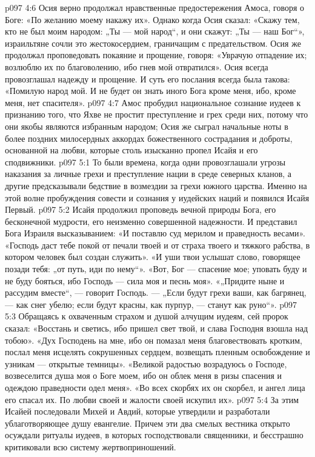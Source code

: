 \vs p097 4:6 Осия верно продолжал нравственные предостережения Амоса, говоря о Боге: «По желанию моему накажу их». Однако когда Осия сказал: «Скажу тем, кто не был моим народом: „Ты --- мой народ“, и они скажут: „Ты --- наш Бог“», израильтяне сочли это жестокосердием, граничащим с предательством. Осия же продолжал проповедовать покаяние и прощение, говоря: «Уврачую отпадение их; возлюблю их по благоволению, ибо гнев мой отвратился». Осия всегда провозглашал надежду и прощение. И суть его послания всегда была такова: «Помилую народ мой. И не будет он знать иного Бога кроме меня, ибо, кроме меня, нет спасителя».
\vs p097 4:7 \pc Амос пробудил национальное сознание иудеев к признанию того, что Яхве не простит преступление и грех среди них, потому что они якобы являются избранным народом; Осия же сыграл начальные ноты в более поздних милосердных аккордах божественного сострадания и доброты, основанной на любви, которые столь изысканно пропел Исайя и его сподвижники.
\vs p097 5:1 То были времена, когда одни провозглашали угрозы наказания за личные грехи и преступление нации в среде северных кланов, а другие предсказывали бедствие в возмездии за грехи южного царства. Именно на этой волне пробуждения совести и сознания у иудейских наций и появился Исайя Первый.
\vs p097 5:2 Исайя продолжил проповедь вечной природы Бога, его бесконечной мудрости, его неизменно совершенной надежности. И представил Бога Израиля высказыванием: «И поставлю суд мерилом и праведность весами». «Господь даст тебе покой от печали твоей и от страха твоего и тяжкого рабства, в котором человек был создан служить». «И уши твои услышат слово, говорящее позади тебя: „от путь, иди по нему“». «Вот, Бог --- спасение мое; уповать буду и не буду бояться, ибо Господь --- сила моя и песнь моя». «„Придите ныне и рассудим вместе“, --- говорит Господь. --- „Если будут грехи ваши, как багрянец, --- как снег убелю; если будут красны, как пурпур, --- станут как руно“».
\vs p097 5:3 Обращаясь к охваченным страхом и душой алчущим иудеям, сей пророк сказал: «Восстань и светись, ибо пришел свет твой, и слава Господня взошла над тобою». «Дух Господень на мне, ибо он помазал меня благовествовать кротким, послал меня исцелять сокрушенных сердцем, возвещать пленным освобождение и узникам --- открытые темницы». «Великой радостью возрадуюсь о Господе, возвеселится душа моя о Боге моем, ибо он облек меня в ризы спасения и одеждою праведности одел меня». «Во всех скорбях их он скорбел, и ангел лица его спасал их. По любви своей и жалости своей искупил их».
\vs p097 5:4 \pc За этим Исайей последовали Михей и Авдий, которые утвердили и разработали ублаготворяющее душу евангелие. Причем эти два смелых вестника открыто осуждали ритуалы иудеев, в которых господствовали священники, и бесстрашно критиковали всю систему жертвоприношений.
